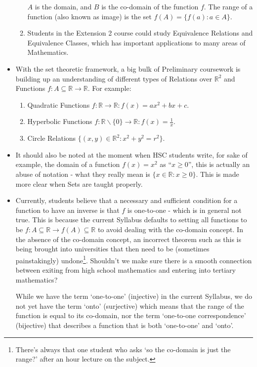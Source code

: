 \documentclass[11pt, a4paper, oneside]{article}
\begin{document}
\begin{itemize}
\begin{enumerate}
\begin{center}
        $A$ is the domain, and $B$ is the co-domain of the function $f$. The range of a function (also known as image) is the set $f(A) = \{f(a) : a \in A\}$.
      \end{center}
    \item Students in the Extension 2 course could study Equivalence Relations and Equivalence Classes, which has important applications to many areas of Mathematics.
    \end{enumerate}
  \item With the set theoretic framework, a big bulk of Preliminary coursework is building up an understanding of different types of Relations over $\mathbb{R}^2$ and Functions $f: A \subseteq \mathbb{R} \rightarrow \mathbb{R}$. For example:
    \begin{enumerate}
      \item Quadratic Functions $f: \mathbb{R} \rightarrow \mathbb{R}: f(x) = ax^2 + bx + c$.
      \item Hyperbolic Functions $f: \mathbb{R}\backslash\{0\} \rightarrow \mathbb{R}: f(x) = \frac{1}{x}$.
      \item Circle Relations $\{ (x,y) \in \mathbb{R}^2: x^2 + y^2 = r^2 \}$.
    \end{enumerate}
  \item It should also be noted at the moment when HSC students write, for sake of example, the domain of a function $f(x) = x^2$ as ``$x \geq 0$'', this is actually an abuse of notation - what they really mean is $\{ x \in \mathbb{R}: x \geq 0\}$. This is made more clear when Sets are taught properly.
  \item Currently, students believe that a necessary and sufficient condition for a function to have an inverse is that $f$ is one-to-one - which is in general not true. This is because the current Syllabus defaults to setting all functions to be $f: A \subseteq \mathbb{R} \rightarrow f(A) \subseteq \mathbb{R}$ to avoid dealing with the co-domain concept. In the absence of the co-domain concept, an incorrect theorem such as this is being brought into universities that then need to be (sometimes painstakingly) undone\footnote{There's always that one student who asks `so the co-domain is just the range?' after an hour lecture on the subject.}. Shouldn't we make sure there is a smooth connection between exiting from high school mathematics and entering into tertiary mathematics?

    While we have the term `one-to-one' (injective) in the current Syllabus, we do not yet have the term `onto' (surjective) which means that the range of the function is equal to its co-domain, nor the term `one-to-one correspondence' (bijective) that describes a function that is both `one-to-one' and `onto'.


\end{itemize}
\end{document}
